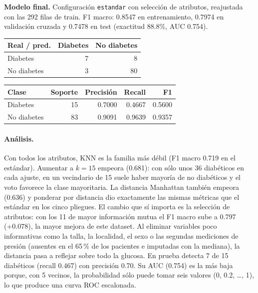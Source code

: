 \documentclass[11pt]{article}
\begin{document}
\textbf{Modelo final.} Configuración \texttt{estandar} con selección de atributos, reajustada con las 292 filas de train. F1 macro: 0.8547 en entrenamiento, 0.7974 en validación cruzada y 0.7478 en test (exactitud 88.8\%, AUC 0.754).

\begin{table}[H]\footnotesize\begin{minipage}[t]{0.44\linewidth}\centering{}\begin{tabular}{lrr}\toprule
Real / pred. & Diabetes & No diabetes \\ \midrule
Diabetes & 7 & 8 \\
No diabetes & 3 & 80 \\
\bottomrule\end{tabular}\end{minipage}\hfill\begin{minipage}[t]{0.52\linewidth}\centering{}\begin{tabular}{lrrrr}\toprule
Clase & Soporte & Precisión & Recall & F1 \\ \midrule
Diabetes & 15 & 0.7000 & 0.4667 & 0.5600 \\
No diabetes & 83 & 0.9091 & 0.9639 & 0.9357 \\
\bottomrule\end{tabular}\end{minipage}\end{table}

\paragraph{Análisis.} Con todos los atributos, KNN es la familia más débil (F1 macro 0.719 en el estándar).
Aumentar a $k=15$ empeora (0.681): con sólo unos 36 diabéticos en cada ajuste, en un
vecindario de 15 suele haber mayoría de no diabéticos y el voto favorece la clase
mayoritaria. La distancia Manhattan también empeora (0.636) y ponderar por distancia dio
exactamente las mismas métricas que el estándar en los cinco pliegues. El cambio que sí
importa es la selección de atributos: con los 11 de mayor información mutua el F1 macro
sube a 0.797 (+0.078), la mayor mejora de este dataset. Al eliminar variables poco
informativas como la talla, la localidad, el sexo o las segundas mediciones de presión
(ausentes en el 65\,\% de los pacientes e imputadas con la mediana), la distancia pasa
a reflejar sobre todo la glucosa. En prueba detecta 7 de 15 diabéticos (recall 0.467)
con precisión 0.70. Su AUC (0.754) es la más baja porque, con 5 vecinos, la
probabilidad sólo puede tomar seis valores (0, 0.2, \dots, 1), lo que produce una curva
ROC escalonada.
\end{document}
